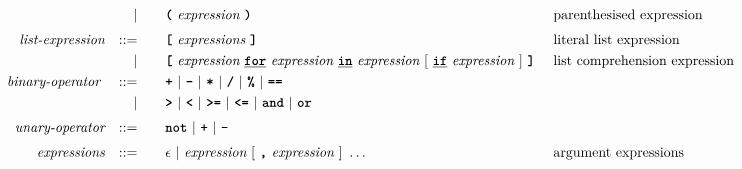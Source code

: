 \begin{alignat*}{9}
&&                       && |   &\quad &&  \textbf{\texttt{(}}\  \textit{expression} \ 
                                            \textbf{\texttt{)}} && \textrm{parenthesised expression}\\[1mm]
&& \textit{list-expression}   && ::= &\quad &&   \textbf{\texttt{[}}\ \textit{expressions}\
                                            \textbf{\texttt{]}}
                                                           && \textrm{literal list expression}\\
&&                       && |   &\quad &&   \textbf{\texttt{[}}\ \textit{expression} \     \textbf{\texttt{\underline{for}}} \ \textit{expression} \ \textbf{\texttt{\underline{in}}} \
                                            \textit{expression} \ [ \ \underline{\textbf{\texttt{if}}} \ \textit{expression} \ ]  \ \textbf{\texttt{]}} \ && \textrm{list comprehension expression}\\
&& \textit{binary-operator}    \ 
                        && ::= &\quad && \textbf{\texttt{+}}\ |\ \textbf{\texttt{-}}\ |\ \textbf{\texttt{*}}\ |\ \textbf{\texttt{/}}\ |\ \textbf{\texttt{\%}}\ |\ 
                                   \textbf{\texttt{==}}\ \\ %
&&                       && |  &\quad &&  \texttt{\textbf{>}}\ |\ \texttt{\textbf{<}}\ |\ \texttt{\textbf{>=}}\ |\ \texttt{\textbf{<=}}\
                                          |\ \textbf{\texttt{and}}\ |\ \texttt{\textbf{or}}\  \\[1mm]
&& \textit{unary-operator}    
                        && ::= &\quad && \textbf{\texttt{not}}\ |\ \textbf{\texttt{+}}\ |\ \textbf{\texttt{-}} \\[1mm]
&& \textit{expressions}  && ::= &\quad && \epsilon\ | \ \textit{expression}\ [
                                                               \ \textbf{\texttt{,}} \
                                                                 \textit{expression} \ 
                                                                      ]\ \ldots
                                                            && \textrm{argument expressions}
\end{alignat*}

\newpage